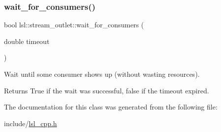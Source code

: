 \subsubsection{\texorpdfstring{wait\+\_\+for\+\_\+consumers()}{wait\_for\_consumers()}}
{\footnotesize\ttfamily bool lsl\+::stream\+\_\+outlet\+::wait\+\_\+for\+\_\+consumers (\begin{DoxyParamCaption}\item[{double}]{timeout }\end{DoxyParamCaption})\hspace{0.3cm}{\ttfamily [inline]}}

Wait until some consumer shows up (without wasting resources). \begin{DoxyReturn}{Returns}
True if the wait was successful, false if the timeout expired. 
\end{DoxyReturn}


The documentation for this class was generated from the following file\+:\begin{DoxyCompactItemize}
\item 
include/\hyperlink{lsl__cpp_8h}{lsl\+\_\+cpp.\+h}\end{DoxyCompactItemize}
